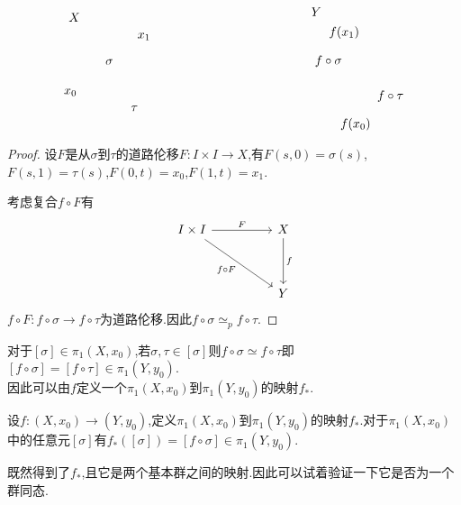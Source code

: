 \documentclass{article}
\begin{document}
\begin{lemma}
\[\begin{tikzpicture}[x=0.75pt,y=0.75pt,yscale=-1,xscale=1]
    \draw (95,87.4) node [anchor=north west][inner sep=0.75pt]    {$\sigma $};
    \draw (51,118.4) node [anchor=north west][inner sep=0.75pt]    {$x_{0}$};
    \draw (129,59.4) node [anchor=north west][inner sep=0.75pt]    {$x_{1}$};
    \draw (122,136.4) node [anchor=north west][inner sep=0.75pt]    {$\tau $};
    \draw (56,38.4) node [anchor=north west][inner sep=0.75pt]    {$X$};
    \draw (332,52.4) node [anchor=north west][inner sep=0.75pt]    {$f( x_{1})$};
    \draw (344,149.4) node [anchor=north west][inner sep=0.75pt]    {$f( x_{0})$};
    \draw (317,83.4) node [anchor=north west][inner sep=0.75pt]    {$f\circ \sigma $};
    \draw (383,120.4) node [anchor=north west][inner sep=0.75pt]    {$f\circ \tau $};
    \draw (313,32.4) node [anchor=north west][inner sep=0.75pt]    {$Y$};
    \end{tikzpicture}\]
\end{lemma}
\begin{proof}
    设$F$是从$\sigma$到$\tau$的道路伦移$F : I \times I \to X$,有$F(s,0) = \sigma(s)$,$F(s,1) = \tau(s)$,$F(0,t) = x_0$,$F(1,t) = x_1$.


    考虑复合$f \circ F$有
    \[\begin{tikzcd}
        {I\times I} && X \\
        \\
        && Y
        \arrow["F", from=1-1, to=1-3]
        \arrow["f", from=1-3, to=3-3]
        \arrow["{f \circ F}"', from=1-1, to=3-3]
    \end{tikzcd}\]
    $f \circ F : f \circ \sigma \to f\circ \tau$为道路伦移.因此$f \circ \sigma \simeq_p f \circ \tau$.
\end{proof}
对于$[\sigma] \in \pi_1(X,x_0)$,若$\sigma,\tau \in [\sigma]$则$f \circ\sigma \simeq f \circ \tau$即$[f \circ \sigma] = [f \circ \tau] \in \pi_1(Y,y_0)$.\\
因此可以由$f$定义一个$\pi_1(X,x_0)$到$\pi_1(Y,y_0)$的映射$f_*$.
\begin{definition}
    设$f : (X,x_0) \to (Y,y_0)$,定义$\pi_1(X,x_0)$到$\pi_1(Y,y_0)$的映射$f_*$.对于$\pi_1(X,x_0)$中的任意元$[\sigma]$有$f_*([\sigma]) = [f \circ \sigma] \in \pi_1(Y,y_0)$.
\end{definition}
既然得到了$f_*$,且它是两个基本群之间的映射.因此可以试着验证一下它是否为一个群同态.
\end{document}
